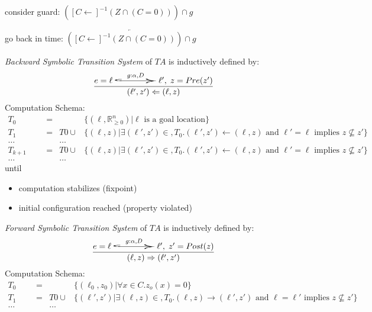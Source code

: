 \documentclass[a4paper, 10pt]{article}
\begin{document}
\begin{mdframed}
\begin{multicols}{2}
\begin{center}
\scalebox{.7}{}
\end{center}
consider guard: $([C\leftarrow]^{-1}(Z\cap(C=0)))\cap g$
\begin{center}
\scalebox{.7}{}
\end{center}
go back in time: $\overleftarrow{([C\leftarrow]^{-1}(Z\cap(C=0)))\cap g}$
\begin{center}
\scalebox{.7}{}
\end{center}
\end{multicols}
\emph{Backward Symbolic Transition System} of $TA$ is inductively defined by:
\[ \frac{
    e=\ell \overset{g:\alpha, D}{\scalebox{5}[1]{$\hookrightarrow$}} \ell',\; z=Pre(z')
}{
    (\ell',z')\Leftarrow (\ell,z)
} \]
Computation Schema:
\begin{align*}
T_0 &&&= &&\{(\ell,\mathds{R}_{\geq0}^n) | \ell \text{ is a goal location}\} \\
T_1 &&&= &T0\cup &\{(\ell,z) | \exists(\ell',z')\in,T_0.(\ell',z')\leftarrow(\ell,z) \text{ and } \ell'=\ell \text{ implies } z\not\subseteq z'\} \\
\dots &&& &\dots \\
T_{k+1} &&&= &T0\cup &\{(\ell,z) | \exists(\ell',z')\in,T_0.(\ell',z')\leftarrow(\ell,z) \text{ and } \ell'=\ell \text{ implies } z\not\subseteq z'\} \\
\dots &&& &\dots
\end{align*}
until
\begin{itemize}
    \item computation stabilizes (fixpoint)
    \item initial configuration reached (property violated)
\end{itemize}
\emph{Forward Symbolic Transition System} of $TA$ is inductively defined by:
\[ \frac{
    e=\ell \overset{g:\alpha, D}{\scalebox{5}[1]{$\hookrightarrow$}} \ell',\; z'=Post(z)
}{
    (\ell,z)\Rightarrow (\ell',z')
} \]
Computation Schema:
\begin{align*}
T_0 &&&= &&\{(\ell_0,z_0) | \forall x\in C.z_o(x)=0\} \\
T_1 &&&= &T0\cup &\{(\ell',z') | \exists(\ell,z)\in,T_0.(\ell,z)\rightarrow(\ell',z') \text{ and } \ell=\ell' \text{ implies } z\not\subseteq z'\} \\
\dots &&& &\dots \\

\end{align*}
\end{mdframed}
\end{document}
